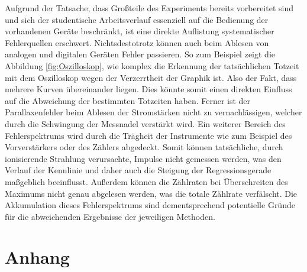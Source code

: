 \noindent Aufgrund der Tatsache, dass Großteile des Experiments bereits vorbereitet sind und sich der studentische Arbeitsverlauf 
essenziell auf die Bedienung der vorhandenen Geräte beschränkt, ist eine direkte Auflistung systematischer Fehlerquellen 
erschwert. Nichtsdestotrotz können auch beim Ablesen von analogen und digitalen Geräten Fehler passieren. So zum Beispiel 
zeigt die Abbildung \ref{fig:Oszilloskop}, wie komplex die Erkennung der tatsächlichen Totzeit mit dem Oszilloskop wegen der 
Verzerrtheit der Graphik ist. Also der Fakt, dass mehrere Kurven übereinander liegen. Dies könnte somit einen direkten Einfluss auf 
die Abweichung der bestimmten Totzeiten haben.
Ferner ist der Parallaxenfehler beim Ablesen der Stromstärken nicht zu vernachlässigen, welcher durch die Schwingung der Messnadel
verstärkt wird. Ein weiterer Bereich des Fehlerspektrums wird durch die Trägheit der Instrumente wie zum Beispiel des Vorverstärkers 
oder des Zählers abgedeckt. Somit können tatsächliche, durch ionisierende Strahlung verursachte, Impulse nicht gemessen werden, 
was den Verlauf der Kennlinie und daher auch die Steigung der Regressionsgerade maßgeblich beeinflusst. Außerdem können die Zählraten 
bei Überschreiten des Maximums nicht genau abgelesen werden, was die totale Zählrate verfälscht.
Die Akkumulation dieses Fehlerspektrums sind dementsprechend potentielle Gründe für die abweichenden Ergebnisse der jeweiligen Methoden.   
 
\section{Anhang}

